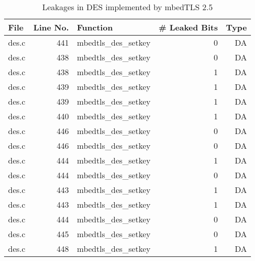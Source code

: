 \begin{table}[h!]
\centering\tiny\scriptsize
\caption{Leakages in DES implemented by mbedTLS 2.5}\label{tab:DESmbedTLS2.5}
\begin{tabular}{lrlrr}
\hline
\textbf{File} & \textbf{Line No.} & \textbf{Function} & \textbf{\# Leaked Bits} & \textbf{Type} \\\hline
des.c& 441&mbedtls\_des\_setkey&0 &DA\\
des.c& 438&mbedtls\_des\_setkey&0 &DA\\
des.c& 438&mbedtls\_des\_setkey&1 &DA\\
des.c& 439&mbedtls\_des\_setkey&1 &DA\\
des.c& 439&mbedtls\_des\_setkey&1 &DA\\
des.c& 440&mbedtls\_des\_setkey&1 &DA\\
des.c& 446&mbedtls\_des\_setkey&0 &DA\\
des.c& 446&mbedtls\_des\_setkey&0 &DA\\
des.c& 444&mbedtls\_des\_setkey&1 &DA\\
des.c& 444&mbedtls\_des\_setkey&0 &DA\\
des.c& 443&mbedtls\_des\_setkey&1 &DA\\
des.c& 443&mbedtls\_des\_setkey&1 &DA\\
des.c& 444&mbedtls\_des\_setkey&0 &DA\\
des.c& 445&mbedtls\_des\_setkey&0 &DA\\
des.c& 448&mbedtls\_des\_setkey&1 &DA\\
\hline
\end{tabular}
\renewcommand{\baselinestretch}{1.0}\selectfont
\end{table}
